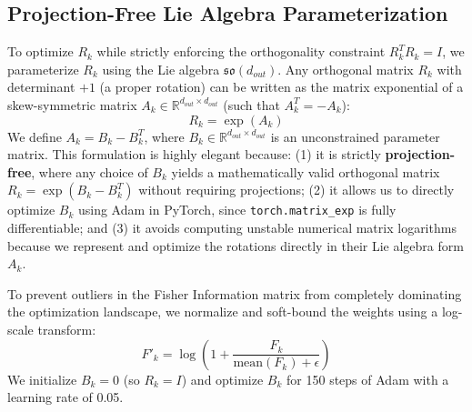 \documentclass{article}
\theoremstyle{plain}
\theoremstyle{definition}
\theoremstyle{remark}
\begin{document}
\subsection{Projection-Free Lie Algebra Parameterization}
To optimize $R_k$ while strictly enforcing the orthogonality constraint $R_k^T R_k = I$, we parameterize $R_k$ using the Lie algebra $\mathfrak{so}(d_{out})$. Any orthogonal matrix $R_k$ with determinant $+1$ (a proper rotation) can be written as the matrix exponential of a skew-symmetric matrix $A_k \in \mathbb{R}^{d_{out} \times d_{out}}$ (such that $A_k^T = -A_k$):
\begin{equation}
    R_k = \exp(A_k)
\end{equation}
We define $A_k = B_k - B_k^T$, where $B_k \in \mathbb{R}^{d_{out} \times d_{out}}$ is an unconstrained parameter matrix. This formulation is highly elegant because: (1) it is strictly \textbf{projection-free}, where any choice of $B_k$ yields a mathematically valid orthogonal matrix $R_k = \exp(B_k - B_k^T)$ without requiring projections; (2) it allows us to directly optimize $B_k$ using Adam in PyTorch, since \texttt{torch.matrix\_exp} is fully differentiable; and (3) it avoids computing unstable numerical matrix logarithms because we represent and optimize the rotations directly in their Lie algebra form $A_k$.

To prevent outliers in the Fisher Information matrix from completely dominating the optimization landscape, we normalize and soft-bound the weights using a log-scale transform:
\begin{equation}
    F'_k = \log \left( 1 + \frac{F_k}{\text{mean}(F_k) + \epsilon} \right)
\end{equation}
We initialize $B_k = 0$ (so $R_k = I$) and optimize $B_k$ for 150 steps of Adam with a learning rate of 0.05.
\end{document}
